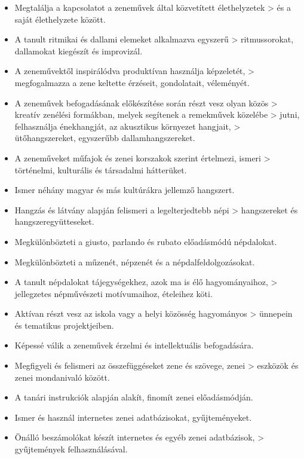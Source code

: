 \begin{itemize}
\item
  Megtalálja a kapcsolatot a zeneművek által közvetített élethelyzetek
  \textgreater{} és a saját élethelyzete között.
\item
  A tanult ritmikai és dallami elemeket alkalmazva egyszerű
  \textgreater{} ritmussorokat, dallamokat kiegészít és improvizál.
\item
  A zeneművektől inspirálódva produktívan használja képzeletét,
  \textgreater{} megfogalmazza a zene keltette érzéseit, gondolatait,
  véleményét.
\item
  A zeneművek befogadásának előkészítése során részt vesz olyan közös
  \textgreater{} kreatív zenélési formákban, melyek segítenek a
  remekművek közelébe \textgreater{} jutni, felhasználja énekhangját, az
  akusztikus környezet hangjait, \textgreater{} ütőhangszereket,
  egyszerűbb dallamhangszereket.
\item
  A zeneműveket műfajok és zenei korszakok szerint értelmezi, ismeri
  \textgreater{} történelmi, kulturális és társadalmi hátterüket.
\item
  Ismer néhány magyar és más kultúrákra jellemző hangszert.
\item
  Hangzás és látvány alapján felismeri a legelterjedtebb népi
  \textgreater{} hangszereket és hangszeregyütteseket.
\item
  Megkülönbözteti a giusto, parlando és rubato előadásmódú népdalokat.
\item
  Megkülönbözteti a műzenét, népzenét és a népdalfeldolgozásokat.
\item
  A tanult népdalokat tájegységekhez, azok ma is élő hagyományaihoz,
  \textgreater{} jellegzetes népművészeti motívumaihoz, ételeihez köti.
\item
  Aktívan részt vesz az iskola vagy a helyi közösség hagyományos
  \textgreater{} ünnepein és tematikus projektjeiben.
\item
  Képessé válik a zeneművek érzelmi és intellektuális befogadására.
\item
  Megfigyeli és felismeri az összefüggéseket zene és szövege, zenei
  \textgreater{} eszközök és zenei mondanivaló között.
\item
  A tanári instrukciók alapján alakít, finomít zenei előadásmódján.
\item
  Ismer és használ internetes zenei adatbázisokat, gyűjteményeket.
\item
  Önálló beszámolókat készít internetes és egyéb zenei adatbázisok,
  \textgreater{} gyűjtemények felhasználásával.
\end{itemize}


